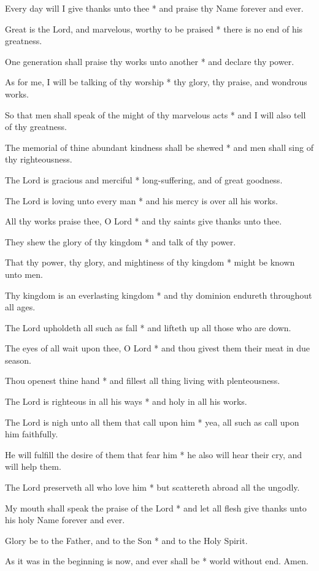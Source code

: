 \begin{multicols}{2}
	Every day will I give thanks unto thee * and praise thy Name forever and ever.
	
	Great is the Lord, and marvelous, worthy to be praised * there is no end of his greatness.
	
	One generation shall praise thy works unto another * and declare thy power.
	
	As for me, I will be talking of thy worship * thy glory, thy praise, and wondrous works.
	
	So that men shall speak of the might of thy marvelous acts * and I will also tell of thy greatness.
	
	The memorial of thine abundant kindness shall be shewed * and men shall sing of thy righteousness.
	
	The Lord is gracious and merciful * long-suffering, and of great goodness.
	
	The Lord is loving unto every man * and his mercy is over all his works.
	
	All thy works praise thee, O Lord * and thy saints give thanks unto thee.
	
	They shew the glory of thy kingdom * and talk of thy power.
	
	That thy power, thy glory, and mightiness of thy kingdom * might be known unto men.
	
	Thy kingdom is an everlasting kingdom * and thy dominion endureth throughout all ages.
	
	The Lord upholdeth all such as fall * and lifteth up all those who are down.
	
	The eyes of all wait upon thee, O Lord * and thou givest them their meat in due season.
	
	Thou openest thine hand * and fillest all thing living with plenteousness.
	
	The Lord is righteous in all his ways * and holy in all his works.
	
	The Lord is nigh unto all them that call upon him * yea, all such as call upon him faithfully.
	
	He will fulfill the desire of them that fear him * he also will hear their cry, and will help them.
	
	The Lord preserveth all who love him * but scattereth abroad all the ungodly.
	
	My mouth shall speak the praise of the Lord * and let all flesh give thanks unto his holy Name forever and ever.
	
	Glory be to the Father, and to the Son * and to the Holy Spirit.
	
	As it was in the beginning is now, and ever shall be * world without end. Amen.
\end{multicols}